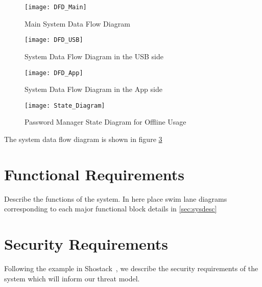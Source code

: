 \begin{figure}
    \centering
    \texttt{[image: DFD\_Main]}
    \caption{Main System Data Flow Diagram}
    \label{fig:dfd}
\end{figure}
\begin{figure}
    \centering
    \texttt{[image: DFD\_USB]}
    \caption{System Data Flow Diagram in the USB side}
    \label{fig:dfd}
\end{figure}
\begin{figure}
    \centering
    \texttt{[image: DFD\_App]}
    \caption{System Data Flow Diagram in the App side}
    \label{fig:dfd}
\end{figure}
\begin{figure}[h]
    \centering
    \texttt{[image: State\_Diagram]}
    \caption{Password Manager State Diagram for Offline Usage}
    \label{fig:state_diagram}
\end{figure}
The system data flow diagram is shown in figure \ref{fig:dfd}

\section{Functional Requirements}
\label{sec:funcreq}
Describe the functions of the system.  In here place swim lane
diagrams corresponding to each major functional block details in
\ref{sec:sysdesc}

\section{Security Requirements}
\label{sec:secreqs}
Following the example in Shostack~\cite{shostackbook}, we describe the
security requirements of the system which will inform our threat
model.
